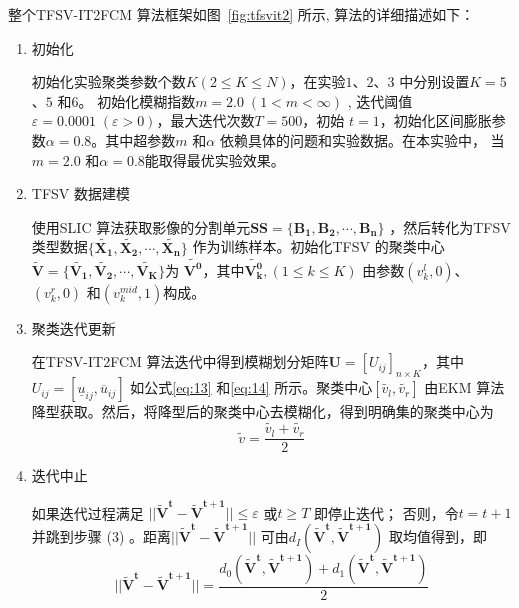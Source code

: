 整个TFSV-IT2FCM 算法框架如图~\ref{fig:tfsvit2} 所示, 算法的详细描述如下：
\begin{enumerate}[(1)]
    \item 初始化

          初始化实验聚类参数个数$K (2 \leq K \leq N)$，在实验$1$、$2$、$3$ 中分别设置$K=5$、$5$ 和$6$。 初始化模糊指数$m = 2.0 \; (1 < m < \infty)$ , 迭代阈值$\varepsilon = 0.0001 \;(\varepsilon > 0)$，最大迭代次数$T = 500$，初始 $t = 1$，初始化区间膨胀参数$\alpha = 0.8$。其中超参数$m$ 和$\alpha$ 依赖具体的问题和实验数据。在本实验中， 当$m = 2.0$ 和$\alpha = 0.8$能取得最优实验效果。

    \item TFSV 数据建模

          使用SLIC 算法获取影像的分割单元$\bm{SS} = \lbrace \bm{B_1}, \bm{B_2},\bm{\cdots}, \bm{B_n} \rbrace$ ，然后转化为TFSV 类型数据$\lbrace \bm{\tilde{X_1}},\bm{\tilde{X_2}},\cdots, \bm{\tilde{X_n}}  \rbrace$ 作为训练样本。初始化TFSV 的聚类中心$\bm{\tilde{V}} = \lbrace \bm{\tilde{V_1}}, \bm{\tilde{V_2}}, \cdots, \bm{\tilde{V_K}} \rbrace$为 $\bm{\tilde{V^0}}$，其中$\bm{\tilde{V_k^0}},(1 \leq k \leq K)$ 由参数$(v_k^l, 0)$、$(v_k^r, 0)$ 和$(v_k^{mid}, 1)$构成。

    \item 聚类迭代更新

          在TFSV-IT2FCM 算法迭代中得到模糊划分矩阵$\bm{U} = [U_{ij}]_{n \times K}$，其中 $U_{ij} = [ \underline{u}_{ij}, \overline{u}_{ij}]$ 如公式\ref{eq:13} 和\ref{eq:14} 所示。聚类中心$[\tilde{v_l},\tilde{v_r}]$ 由EKM 算法降型获取。然后，将降型后的聚类中心去模糊化，得到明确集的聚类中心为
          \begin{equation}\label{eq:19}
              \tilde{v} = \frac{\tilde{v_l}+ \tilde{v_r}}{2}
          \end{equation}

    \item 迭代中止

          如果迭代过程满足 $||\bm{\tilde{V}^t} - \bm{\tilde{V}^{t+1}}|| \leq \varepsilon$ 或$t \geq T$ 即停止迭代； 否则，令$t = t+1$ 并跳到步骤 (3) 。距离$||\bm{\tilde{V}^t} - \bm{\tilde{V}^{t+1}}||$ 可由$d_I(\bm{\tilde{V}^t},\bm{\tilde{V}^{t+1}})$ 取均值得到，即
          \begin{equation}\label{eq:20}
              ||\bm{\tilde{V}^t} - \bm{\tilde{V}^{t+1}}|| = \frac{d_0(\bm{\tilde{V}^t}, \bm{\tilde{V}^{t+1}})+ d_1(\bm{\tilde{V}^t}, \bm{\tilde{V}^{t+1}})}{2}
          \end{equation}


\end{enumerate}
